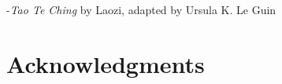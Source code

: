 \hspace{40mm}-\textit{Tao Te Ching} by Laozi, adapted by Ursula K. Le Guin


\normalsize
\vfill
\hspace{0pt}

\cleardoublepage

\section*{Acknowledgments}

%
%
%
%
